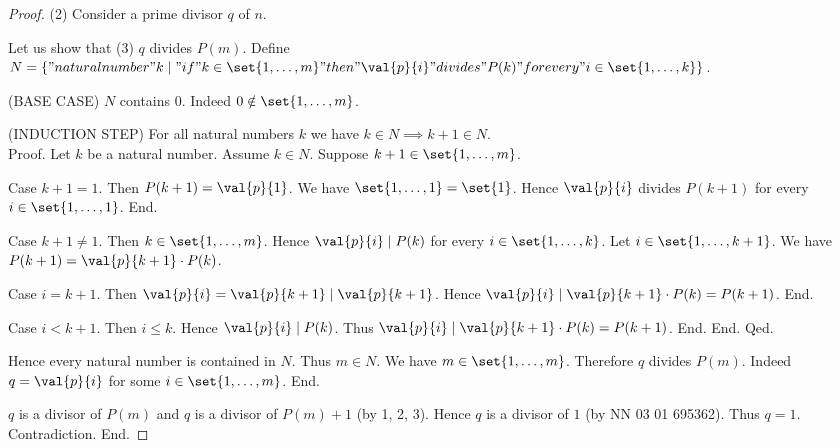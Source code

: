 \documentclass[../../basic-notions.ftl.tex]{subfiles}
\begin{document}
\begin{forthel}
\begin{proof}
        (2) Consider a prime divisor $q$ of $n$.

        Let us show that (3) $q$ divides $P(m)$.
          Define $N = \{ "natural number" k \mid "if" k \in \set{1, \dots, m} "then" \val{p}{i} "divides" P(k) "for every" i \in \set{1, \dots, k} \}$.

          (BASE CASE) $N$ contains $0$.
          Indeed $0 \notin \set{1, \dots, m}$.

          (INDUCTION STEP) For all natural numbers $k$ we have $k \in N \implies k + 1 \in N$. \\
          Proof.
            Let $k$ be a natural number.
            Assume $k \in N$.
            Suppose $k + 1 \in \set{1, \dots, m}$.

            Case $k + 1 = 1$.
              Then $P(k + 1) = \val{p}{1}$.
              We have $\set{1, \dots, 1} = \set{1}$.
              Hence $\val{p}{i}$ divides $P(k + 1)$ for every $i \in \set{1, \dots, 1}$.
            End.

            Case $k + 1 \neq 1$.
              Then $k \in \set{1, \dots, m}$.
              Hence $\val{p}{i} \mid P(k)$ for every $i \in \set{1, \dots, k}$.
              Let $i \in \set{1, \dots, k + 1}$.
              We have $P(k + 1) = \val{p}{k + 1} \cdot P(k)$.

              Case $i = k + 1$.
                Then $\val{p}{i} = \val{p}{k + 1} \mid \val{p}{k + 1}$.
                Hence $\val{p}{i} \mid \val{p}{k + 1} \cdot P(k) = P(k + 1)$.
              End.

              Case $i < k + 1$.
                Then $i \leq k$.
                Hence $\val{p}{i} \mid P(k)$.
                Thus $\val{p}{i} \mid \val{p}{k + 1} \cdot P(k) = P(k + 1)$.
              End.
            End.
          Qed.

          Hence every natural number is contained in $N$.
          Thus $m \in N$.
          We have $m \in \set{1, \dots, m}$.
          Therefore $q$ divides $P(m)$.
          Indeed $q = \val{p}{i}$ for some $i \in \set{1, \dots, m}$.
        End.

        $q$ is a divisor of $P(m)$ and $q$ is a divisor of $P(m) + 1$ (by 1, 2, 3).
        Hence $q$ is a divisor of $1$ (by NN 03 01 695362).
        Thus $q = 1$.
        Contradiction.
      End.
    \end{proof}
  \end{forthel}
\end{document}
